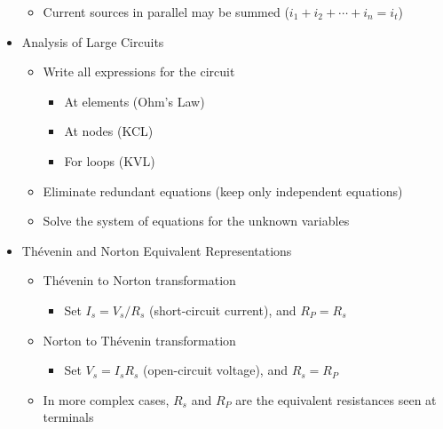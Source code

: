 \begin{itemize}
\begin{itemize}
      \item Current sources in parallel may be summed ($i_1+i_2+\cdots+i_n=i_t$)

    \end{itemize}

  \item Analysis of Large Circuits

    \begin{itemize}

      \item Write all expressions for the circuit

        \begin{itemize}

          \item At elements (Ohm's Law)

          \item At nodes (KCL)

          \item For loops (KVL)

        \end{itemize}

      \item Eliminate redundant equations (keep only independent equations)

      \item Solve the system of equations for the unknown variables

    \end{itemize}

  \item Th\'evenin and Norton Equivalent Representations

    \begin{itemize}

      \item Th\'evenin to Norton transformation

        \begin{itemize}

          \item Set $I_s=V_s/R_s$ (short-circuit current), and $R_P=R_s$

        \end{itemize}

      \item Norton to Th\'evenin transformation

        \begin{itemize}

          \item Set $V_s=I_sR_s$ (open-circuit voltage), and $R_s=R_P$

          \end{itemize}

      \item In more complex cases, $R_s$ and $R_P$ are the equivalent resistances seen at terminals

    \end{itemize}

\end{itemize}



